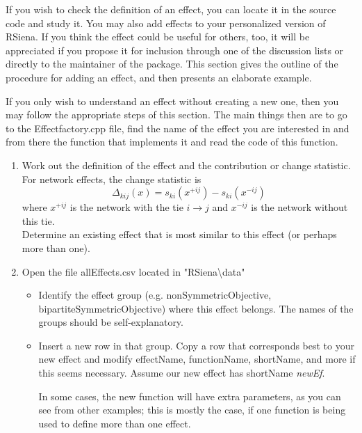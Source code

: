 \documentclass[a4paper,fleqn,11pt]{article}
\newcommand{\+}{\, + \,}
\newcommand{\rs}{{\sf RSiena}}
\begin{document}
{If you wish to check the definition of an effect,
you can locate it in the source code and study it.
You may also add
effects to your personalized version of \rs.
If you think the effect could be useful for others, too,
it will be appreciated if you propose it for inclusion through
one of the discussion lists or directly to the maintainer
of the package.
This section gives the outline of the procedure for adding an effect, and then presents
an elaborate example.

If you only wish to understand an effect without creating
a new one, then you may
follow the appropriate steps of this section.
The main things then are to go to the \textsf{Effectfactory.cpp}
file, find the name of the effect you are interested in and
from there the function that implements it
and read the code of this function.

\begin{enumerate}

\item Work out the definition of the effect and the contribution or
      change statistic.
      For network effects, the change statistic is
      \begin{equation}
      \Delta_{kij} (x) =  s_{ki}(x^{+ij}) -     s_{ki}(x^{-ij})  \label{changestat}
      \end{equation}
      where $x^{+ij}$ is the network with the tie $i \rightarrow j$
      and $x^{-ij}$ is the network without this tie.\\
      Determine an existing effect that is most similar
      to this effect (or perhaps more than one).
\item Open the file \textsf{allEffects.csv} located in
       \textsf{"RSiena\textbackslash data"}
	   \begin{itemize}
		\item Identify the effect group
               (e.g. nonSymmetricObjective,  bipartiteSymmetricObjective)
              where this effect belongs.
              The names of the groups should be self-explanatory.
    	\item Insert a new row in that group.
              Copy a row that corresponds best to your new effect
              and modify effectName, functionName, shortName,
              and more if this seems necessary. Assume
              our new effect has shortName
              \textit{newEf}.

              In some cases, the new function will have extra parameters,
              as you can see from other examples;
              this is mostly the case, if one function is being used to define
              more than one effect.


\end{itemize}
\end{enumerate}}
\end{document}
